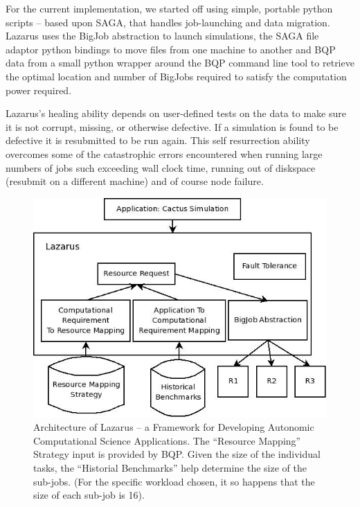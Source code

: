 \documentclass{sig-alternate}
\newcommand{\up}{\vspace*{-0.3em}}
\begin{document}
For the current implementation, we started off using simple, portable
python scripts -- based upon SAGA, that handles job-launching and data
migration. %
Lazarus uses the BigJob abstraction to launch simulations,
the SAGA file adaptor python bindings to move files from one machine
to another and BQP data from a small python wrapper around the BQP
command line tool to retrieve the optimal location and number of
BigJobs required to satisfy the computation power required.

Lazarus's healing ability depends on user-defined tests on the data to
make sure it is not corrupt, missing, or otherwise defective. If a
simulation is found to be defective it is resubmitted to be run
again. This self resurrection ability overcomes some of the
catastrophic errors encountered when running large numbers of jobs
such exceeding wall clock time, running out of diskspace (resubmit on
a different machine) and of course node failure.

\begin{figure}
\begin{center}
\includegraphics[scale=0.4]{./figures/Lazarus_01.jpeg}
\end{center}
\caption{Architecture of Lazarus -- a Framework for Developing
  Autonomic Computational Science Applications. The ``Resource
  Mapping'' Strategy input is provided by BQP. Given the size of the
  individual tasks, the ``Historial Benchmarks'' help determine the
  size of the sub-jobs. (For the specific workload chosen, it so
  happens that the size of each sub-job is 16).}\up\up\up \up\up\up
\label{fig:application_architecture}
\end{figure}
\end{document}

